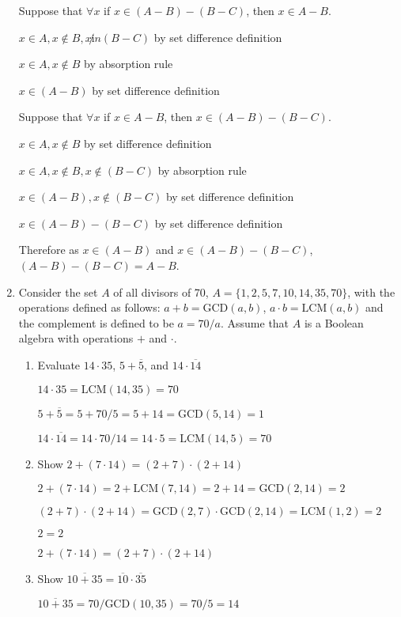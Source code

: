 \documentclass[12pt,letterpaper,titlepage]{article}
\begin{document}
\begin{raggedright}
\begin{enumerate}
Suppose that $\forall x$ if $x\in (A-B)-(B-C)$, then $x \in A - B$.

$x\in A, x\not\in B, x\not in (B - C)$ by set difference definition

$x\in A, x\not\in B$ by absorption rule

$x\in (A - B)$ by set difference definition

Suppose that $\forall x$ if $x \in A - B$, then $x\in (A-B)-(B-C)$.

$x\in A, x\not\in B$ by set difference definition

$x\in A, x\not\in B, x\not\in (B - C)$ by absorption rule

$x\in (A - B), x\not\in (B-C)$ by set difference definition

$x\in (A - B) - (B-C)$ by set difference definition

Therefore as $x\in (A - B)$ and $x\in (A - B) - (B-C)$, $(A-B)-(B-C)=A-B$.

\clearpage

\item Consider the set $A$ of all divisors of 70, $A = \{1, 2, 5, 7, 10, 14, 35, 70\}$, with the operations defined as follows: $a + b = \text{GCD}(a, b)$, $a \cdot b = \text{LCM}(a, b)$ and the complement is defined to be $a = 70 / a$. Assume that $A$ is a Boolean algebra with operations $+$ and $\cdot$.

\begin{enumerate}[label=(\alph*)]
\item Evaluate $14\cdot 35$, $5+\overline{5}$, and $14\cdot\overline{14}$

$14\cdot 35 = \text{LCM}(14, 35) = 70$

$5+\overline{5} = 5 + 70 / 5 = 5 + 14 = \text{GCD}(5, 14) = 1$

$14\cdot\overline{14} = 14\cdot 70/14 = 14\cdot 5  = \text{LCM}(14, 5) = 70$

\item Show $2+(7\cdot 14)=(2+7)\cdot(2+14)$

$2+(7\cdot 14)=2+\text{LCM}(7, 14)= 2 + 14 = \text{GCD}(2, 14) = 2$

$(2+7)\cdot(2+14) = \text{GCD}(2, 7)\cdot\text{GCD}(2, 14) = \text{LCM}(1, 2) = 2$

$2 = 2$

$2+(7\cdot 14)=(2+7)\cdot(2+14)$

\item Show $\overline{10+35}=\overline{10}\cdot\overline{35}$

$\overline{10+35} = 70 / \text{GCD}(10, 35) = 70 / 5 = 14$


\end{enumerate}
\end{enumerate}
\end{raggedright}
\end{document}
